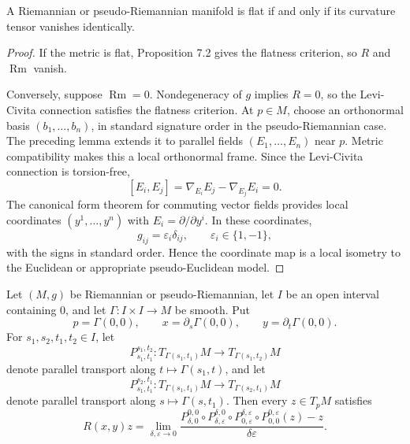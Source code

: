 \begin{theorem}
\label{thm:flatness-iff-zero-curvature}

A Riemannian or pseudo-Riemannian manifold is flat if and only if its curvature
tensor vanishes identically.
\end{theorem}

\begin{proof}
\sketch If the metric is flat, Proposition 7.2 gives the flatness criterion,
so $R$ and $\operatorname{Rm}$ vanish.

Conversely, suppose $\operatorname{Rm}=0$. Nondegeneracy of $g$ implies
$R=0$, so the Levi-Civita connection satisfies the flatness criterion. At
$p\in M$, choose an orthonormal basis $(b_1,\ldots,b_n)$, in standard signature
order in the pseudo-Riemannian case. The preceding lemma extends it to parallel
fields $(E_1,\ldots,E_n)$ near $p$. Metric compatibility makes this a local
orthonormal frame. Since the Levi-Civita connection is torsion-free,
\[
[E_i,E_j]=\nabla_{E_i}E_j-\nabla_{E_j}E_i=0.
\]
The canonical form theorem for commuting vector fields provides local
coordinates $(y^1,\ldots,y^n)$ with $E_i=\partial/\partial y^i$. In these
coordinates,
\[
g_{ij}=\varepsilon_i\delta_{ij},
\qquad \varepsilon_i\in\{1,-1\},
\]
with the signs in standard order. Hence the coordinate map is a local isometry
to the Euclidean or appropriate pseudo-Euclidean model.
\end{proof}

\begin{theorem}
\label{thm:curvature-endomorphism-formula}

Let $(M,g)$ be Riemannian or pseudo-Riemannian, let $I$ be an open interval
containing $0$, and let $\Gamma\colon I\times I\to M$ be smooth. Put
\[
p=\Gamma(0,0),
\qquad x=\partial_s\Gamma(0,0),
\qquad y=\partial_t\Gamma(0,0).
\]
For $s_1,s_2,t_1,t_2\in I$, let
\[
P_{s_1,t_1}^{s_1,t_2}
\colon T_{\Gamma(s_1,t_1)}M\longrightarrow T_{\Gamma(s_1,t_2)}M
\]
denote parallel transport along $t\mapsto\Gamma(s_1,t)$, and let
\[
P_{s_1,t_1}^{s_2,t_1}
\colon T_{\Gamma(s_1,t_1)}M\longrightarrow T_{\Gamma(s_2,t_1)}M
\]
denote parallel transport along $s\mapsto\Gamma(s,t_1)$. Then every
$z\in T_pM$ satisfies
\begin{equation}
R(x,y)z
=\lim_{\delta,\varepsilon\to0}
\frac{
P_{\delta,0}^{0,0}\circ
P_{\delta,\varepsilon}^{\delta,0}\circ
P_{0,\varepsilon}^{\delta,\varepsilon}\circ
P_{0,0}^{0,\varepsilon}(z)-z
}{\delta\varepsilon}. \tag{7.10}
\end{equation}
\end{theorem}

